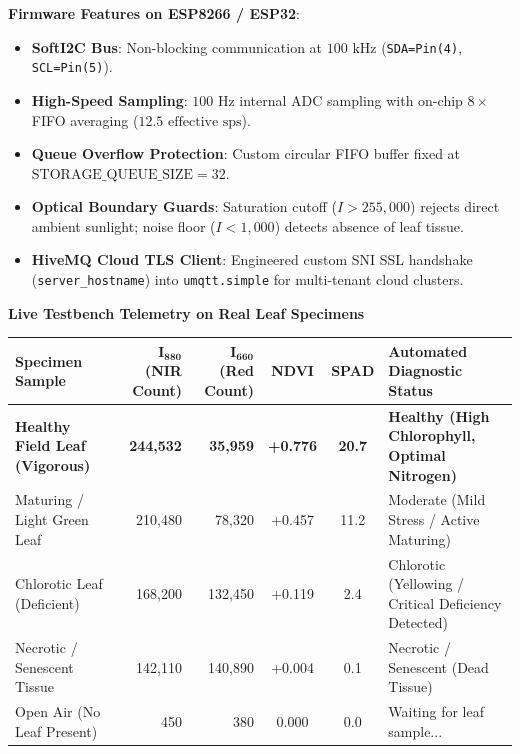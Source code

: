 \documentclass[11pt,a4paper,landscape]{article}
\begin{document}
\begin{minipage}[t]{0.48\textwidth}
\begin{tcolorbox}[colback=white,colframe=accent,title=\textbf{Edge MicroPython Implementation},arc=2mm]
\textbf{Firmware Features on ESP8266 / ESP32}:
\begin{itemize}[leftmargin=*]
    \item \textbf{SoftI2C Bus}: Non-blocking communication at $100\text{ kHz}$ (\texttt{SDA=Pin(4)}, \texttt{SCL=Pin(5)}).
    \item \textbf{High-Speed Sampling}: $100\text{ Hz}$ internal ADC sampling with on-chip $8\times$ FIFO averaging ($12.5\text{ effective sps}$).
    \item \textbf{Queue Overflow Protection}: Custom circular FIFO buffer fixed at $\text{STORAGE\_QUEUE\_SIZE} = 32$.
    \item \textbf{Optical Boundary Guards}: Saturation cutoff ($I > 255,000$) rejects direct ambient sunlight; noise floor ($I < 1,000$) detects absence of leaf tissue.
    \item \textbf{HiveMQ Cloud TLS Client}: Engineered custom SNI SSL handshake (\texttt{server\_hostname}) into \texttt{umqtt.simple} for multi-tenant cloud clusters.
\end{itemize}
\end{tcolorbox}
\end{minipage}

\vspace{0.4cm}
\begin{center}
\textbf{\large Live Testbench Telemetry on Real Leaf Specimens} \\[4pt]
\small
\begin{tabularx}{\textwidth}{l r r c c l}
\toprule
\textbf{Specimen Sample} & $\mathbf{I_{880}}$ \textbf{(NIR Count)} & $\mathbf{I_{660}}$ \textbf{(Red Count)} & \textbf{NDVI} & \textbf{SPAD} & \textbf{Automated Diagnostic Status} \\
\midrule
\rowcolor{green!10}
\textbf{Healthy Field Leaf (Vigorous)} & \textbf{244,532} & \textbf{35,959} & \textbf{+0.776} & \textbf{20.7} & \textbf{Healthy (High Chlorophyll, Optimal Nitrogen)} \\
Maturing / Light Green Leaf & 210,480 & 78,320 & +0.457 & 11.2 & Moderate (Mild Stress / Active Maturing) \\
\rowcolor{yellow!10}
Chlorotic Leaf (Deficient) & 168,200 & 132,450 & +0.119 & 2.4 & Chlorotic (Yellowing / Critical Deficiency Detected) \\
\rowcolor{red!10}
Necrotic / Senescent Tissue & 142,110 & 140,890 & +0.004 & 0.1 & Necrotic / Senescent (Dead Tissue) \\
Open Air (No Leaf Present) & 450 & 380 & 0.000 & 0.0 & Waiting for leaf sample... \\
\bottomrule
\end{tabularx}
\end{center}
\end{document}
